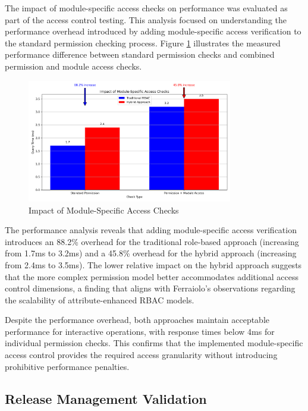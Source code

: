 The impact of module-specific access checks on performance was evaluated as part of the access control testing. This analysis focused on understanding the performance overhead introduced by adding module-specific access verification to the standard permission checking process. Figure \ref{fig:module-access-impact} illustrates the measured performance difference between standard permission checks and combined permission and module access checks.

\begin{figure}[h]
    \centering
    \includegraphics[width=0.8\textwidth]{figures/module_access_impact.png}
    \caption{Impact of Module-Specific Access Checks}
    \label{fig:module-access-impact}
\end{figure}

The performance analysis reveals that adding module-specific access verification introduces an 88.2\% overhead for the traditional role-based approach (increasing from 1.7ms to 3.2ms) and a 45.8\% overhead for the hybrid approach (increasing from 2.4ms to 3.5ms). The lower relative impact on the hybrid approach suggests that the more complex permission model better accommodates additional access control dimensions, a finding that aligns with Ferraiolo's observations \cite{ferraiolo2011policy} regarding the scalability of attribute-enhanced RBAC models.

Despite the performance overhead, both approaches maintain acceptable performance for interactive operations, with response times below 4ms for individual permission checks. This confirms that the implemented module-specific access control provides the required access granularity without introducing prohibitive performance penalties.

\subsection{Release Management Validation}
\label{subsec:release-management-validation}


